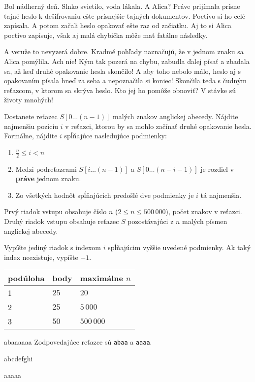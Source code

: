 
\usepackage[slovak]{babel}





Bol nádherný deň. Slnko svietilo, voda lákala. A Alica? Práve prijímala prísne
tajné heslo k dešifrovaniu ešte prísnejšie tajných dokumentov. Poctivo si ho
celé zapísala. A potom začali heslo opakovať ešte raz od začiatku. Aj to si Alica
poctivo zapisuje, však aj malá chybička môže mať fatálne následky.

A veruže to nevyzerá dobre. Kradmé pohľady naznačujú, že v jednom znaku sa Alica
pomýlila. Ach nie! Kým tak pozerá na chybu, zabudla ďalej písať a zbadala sa, až keď
druhé opakovanie hesla skončilo! A aby toho nebolo málo, heslo aj s opakovaním
písala hneď za seba a nepoznačila si koniec! Skončila teda s čudným reťazcom, v
ktorom sa skrýva heslo. Kto jej ho pomôže obnoviť? V stávke sú životy mnohých!


Dostanete reťazec $S[0 \ldots (n-1)]$ malých znakov anglickej abecedy. Nájdite najmenšiu pozíciu $i$
v reťazci, ktorou by sa mohlo začínať druhé opakovanie hesla. Formálne, nájdite $i$ spĺňajúce
nasledujúce podmienky:

\begin{enumerate}
    \item $\frac{n}{2} \leq i < n$
    \item Medzi podreťazcami $S[i \ldots (n-1)]$ a $S[0 \ldots (n - i - 1)]$ je
    rozdiel v \textbf{práve} jednom znaku.
    \item Zo všetkých hodnôt spĺňajúcich predošlé dve podmienky je $i$ tá najmenšia.
\end{enumerate}


Prvý riadok vstupu obsahuje číslo $n$ ($2 \leq n \leq 500\,000$), počet znakov v reťazci.
Druhý riadok vstupu obsahuje reťazec $S$ pozostávajúci z $n$ malých písmen anglickej abecedy.


Vypíšte jediný riadok s indexom $i$ spĺňajúcim vyššie uvedené podmienky. Ak taký index neexistuje,
vypíšte $-1$.


\begin{center}
\begin{tabular}{|l|l|l|}
\hline
podúloha & body & maximálne $n$  \\ \hline
1       & $25$     & $20$           \\ \hline
2       & $25$     & $5\,000$         \\ \hline
3       & $50$     & $500\,000$       \\ \hline
\end{tabular}
\end{center}



abaaaaaa
\sampleCOMMENT
Zodpovedajúce reťazce sú \texttt{abaa} a \texttt{aaaa}.
\sampleEND


\bigskip


abcdefghi
\sampleEND

\bigskip

aaaaa
\sampleEND


